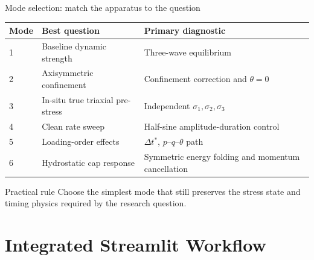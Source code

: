 \documentclass[11pt,aspectratio=169]{beamer}
\newcommand{\toprule}{\hline}
\newcommand{\midrule}{\hline}
\newcommand{\bottomrule}{\hline}
\begin{document}
\begin{frame}{Mode selection: match the apparatus to the question}
  \small
  \begin{tabular}{@{}p{}p{}p{}@{}}
    \toprule
    \textbf{Mode} & \textbf{Best question} & \textbf{Primary diagnostic} \\
    \midrule
    1 & Baseline dynamic strength & Three-wave equilibrium \\
    2 & Axisymmetric confinement & Confinement correction and $\theta=0$ \\
    3 & In-situ true triaxial pre-stress & Independent $\sigma_1,\sigma_2,\sigma_3$ \\
    4 & Clean rate sweep & Half-sine amplitude-duration control \\
    5 & Loading-order effects & $\Delta t^\ast$, $p$--$q$--$\theta$ path \\
    6 & Hydrostatic cap response & Symmetric energy folding and momentum cancellation \\
    \bottomrule
  \end{tabular}
  \vspace{0.35cm}
  \begin{block}{Practical rule}
    Choose the simplest mode that still preserves the stress state and timing
    physics required by the research question.
  \end{block}
\end{frame}

\section{Integrated Streamlit Workflow}
\end{document}
